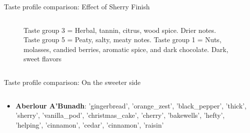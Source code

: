 \documentclass{beamer}
\begin{document}
\begin{frame}{Taste profile comparison: Effect of Sherry Finish}
\begin{columns}
\begin{column}{0.6\textwidth}
\begin{figure}[H]
\begin{center}
					\caption{Taste group 3 = Herbal, tannin, citrus, wood spice. Drier notes. Taste group 5 = Peaty, salty, meaty notes. Taste group 1 = Nuts, molasses, candied berries, aromatic spice, and dark chocolate. Dark, sweet flavors}
				\end{center}
			\end{figure}
		\end{column}
		
		
	\end{columns}
\end{frame}

	\begin{frame}{Taste profile comparison: On the sweeter side}
	\fontsize{8pt}{8pt}\selectfont
	
	\begin{columns}
		\begin{column}{0.4\textwidth}
			\begin{itemize}
				\item \textbf{Aberlour A'Bunadh}: 'gingerbread', 'orange\_zest', 'black\_pepper', 'thick', 'sherry', 'vanilla\_pod', 'christmas\_cake', 'cherry', 'bakewells', 'hefty', 'helping', 'cinnamon', 'cedar', 'cinnamon', 'raisin'
				

\end{itemize}
\end{column}
\end{columns}
\end{frame}
\end{document}
